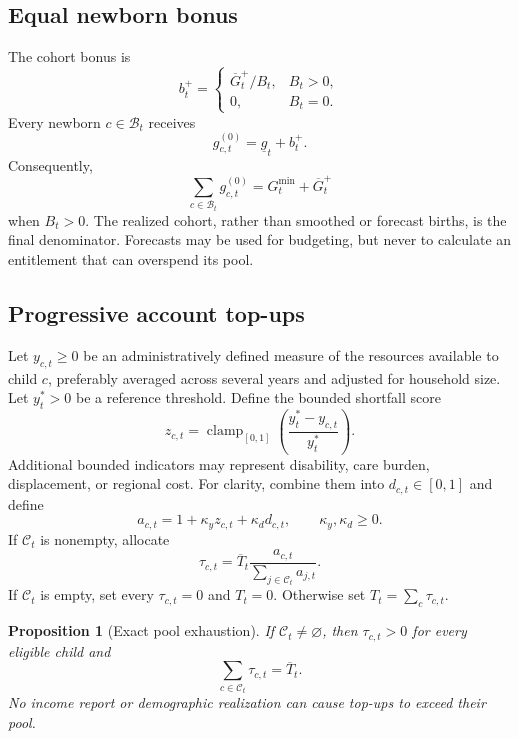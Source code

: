\documentclass[11pt]{article}
\newtheorem{proposition}[definition]{Proposition}
\newcommand{\clamp}[1]{\operatorname{clamp}_{[0,1]}\!\left(#1\right)}
\begin{document}
\subsection{Equal newborn bonus}

The cohort bonus is
\begin{equation}
  b_t^{+}=
  \begin{cases}
    \overline G_t^{+}/B_t, & B_t>0,\\
    0, & B_t=0.
  \end{cases}
\end{equation}
Every newborn $c\in\mathcal B_t$ receives
\begin{equation}
  g_{c,t}^{(0)}=\underline g_t+b_t^{+}.
\end{equation}
Consequently,
\begin{equation}
  \sum_{c\in\mathcal B_t}g_{c,t}^{(0)}
  =G_t^{\min}+\overline G_t^{+}
\end{equation}
when $B_t>0$. The realized cohort, rather than smoothed or forecast births, is the final
denominator. Forecasts may be used for budgeting, but never to calculate an entitlement
that can overspend its pool.

\subsection{Progressive account top-ups}

Let $y_{c,t}\ge0$ be an administratively defined measure of the resources available to
child $c$, preferably averaged across several years and adjusted for household size.
Let $y_t^*>0$ be a reference threshold. Define the bounded shortfall score
\begin{equation}
  z_{c,t}=\clamp{\frac{y_t^*-y_{c,t}}{y_t^*}}.
\end{equation}
Additional bounded indicators may represent disability, care burden, displacement, or
regional cost. For clarity, combine them into $d_{c,t}\in[0,1]$ and define
\begin{equation}
  a_{c,t}=1+\kappa_yz_{c,t}+\kappa_dd_{c,t},
  \qquad \kappa_y,\kappa_d\ge0.
\end{equation}
If $\mathcal C_t$ is nonempty, allocate
\begin{equation}
  \tau_{c,t}=\overline T_t
  \frac{a_{c,t}}{\sum_{j\in\mathcal C_t}a_{j,t}}.
\end{equation}
If $\mathcal C_t$ is empty, set every $\tau_{c,t}=0$ and $T_t=0$. Otherwise set
$T_t=\sum_c\tau_{c,t}$.

\begin{proposition}[Exact pool exhaustion]
If $\mathcal C_t\ne\varnothing$, then $\tau_{c,t}>0$ for every eligible child and
\begin{equation}
  \sum_{c\in\mathcal C_t}\tau_{c,t}=\overline T_t.
\end{equation}
No income report or demographic realization can cause top-ups to exceed their pool.
\end{proposition}
\end{document}
